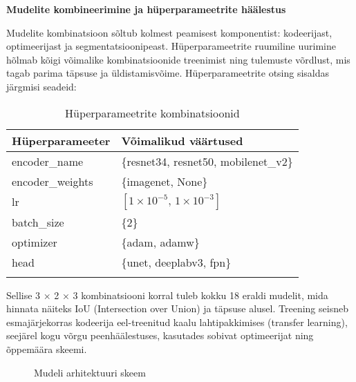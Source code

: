 \textbf{Mudelite kombineerimine ja hüperparameetrite häälestus}

Mudelite kombinatsioon sõltub kolmest peamisest komponentist: kodeerijast, optimeerijast ja segmentatsioonipeast. Hüperparameetrite ruumiline uurimine hõlmab kõigi võimalike kombinatsioonide treenimist ning tulemuste võrdlust, mis tagab parima täpsuse ja üldistamisvõime. Hüperparameetrite otsing sisaldas järgmisi seadeid:

\begin{longtable}{ll}
    \hline
    \textbf{Hüperparameeter} & \textbf{Võimalikud väärtused} \\
    \hline
    encoder\_name      & \{resnet34, resnet50, mobilenet\_v2\} \\
    encoder\_weights   & \{imagenet, None\} \\
    lr                 & $[1\times10^{-5},\,1\times10^{-3}]$ \\
    batch\_size        & \{2\} \\
    optimizer          & \{adam, adamw\} \\
    head               & \{unet, deeplabv3, fpn\} \\
    \hline
    \caption{Hüperparameetrite kombinatsioonid}
    \label{tab:hyperparameter_kombinatsioonid}
\end{longtable}


Sellise 3 × 2 × 3 kombinatsiooni korral tuleb kokku 18 eraldi mudelit, mida hinnata näiteks IoU (Intersection over Union) ja täpsuse alusel. Treening seisneb esmajärjekorras kodeerija eel-treenitud kaalu lahtipakkimises (transfer learning), seejärel kogu võrgu peenhäälestuses, kasutades sobivat optimeerijat ning õppemäära skeemi.


\begin{figure}[H]
    \centering
    \caption{Mudeli arhitektuuri skeem}
    \label{fig:model_architecture}
\end{figure}

